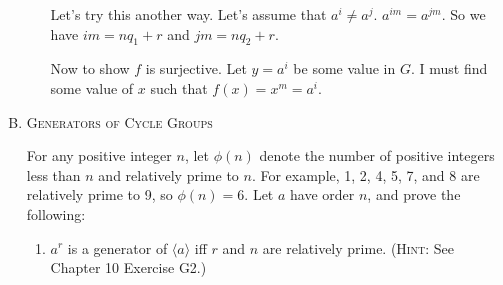 \documentclass[twoside]{amsart}
\newcommand{\blank}{\vspace{5pt}}
\newcommand{\ind}{\hspace{.35in}}
\newcommand{\itm}{\blank\item}
\begin{document}
\begin{enumerate}[A.]
\begin{enumerate}[1)]
      Let's try this another way. Let's assume that $a^i \ne a^j$.
      $a^{im} = a^{jm}$. So we have $im = nq_1+r$ and $jm = nq_2 + r$.



      \ind Now to show $f$ is surjective. Let $y = a^i$ be
      some value in $G$. I must find some value of $x$
      such that $f(x) = x^m = a^i$.

      
   \end{enumerate}

   \itm \textsc{Generators of Cycle Groups}

   \noindent For any positive integer $n$, let $\phi(n)$ denote the
   number of positive integers less than $n$ and relatively prime to
   $n$. For example, 1, 2, 4, 5, 7, and 8 are relatively prime to 9,
   so $\phi(n) = 6$. Let $a$ have order $n$, and prove the following:

   \begin{enumerate}
     \item $a^r$ is a generator of $\langle a \rangle$ iff $r$ and $n$
       are relatively prime. (\textsc{Hint}: See Chapter 10 Exercise G2.)
   \end{enumerate}

\end{enumerate}
\end{document}
